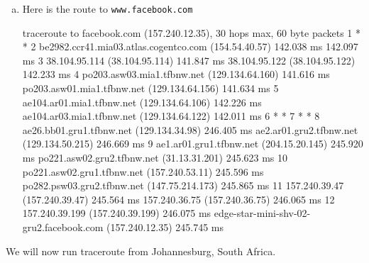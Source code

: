 \begin{enumerate}[a.]
\item Here is the route to {\tt www.facebook.com}
\begin{code}
traceroute to facebook.com (157.240.12.35), 30 hops max, 60 byte packets
 1  * *
 2  be2982.ccr41.mia03.atlas.cogentco.com (154.54.40.57)  142.038 ms  142.097 ms
 3  38.104.95.114 (38.104.95.114)  141.847 ms 38.104.95.122 (38.104.95.122)  142.233 ms
 4  po203.asw03.mia1.tfbnw.net (129.134.64.160)  141.616 ms po203.asw01.mia1.tfbnw.net (129.134.64.156)  141.634 ms
 5  ae104.ar01.mia1.tfbnw.net (129.134.64.106)  142.226 ms ae104.ar03.mia1.tfbnw.net (129.134.64.122)  142.011 ms
 6  * *
 7  * *
 8  ae26.bb01.gru1.tfbnw.net (129.134.34.98)  246.405 ms ae2.ar01.gru2.tfbnw.net (129.134.50.215)  246.669 ms
 9  ae1.ar01.gru1.tfbnw.net (204.15.20.145)  245.920 ms po221.asw02.gru2.tfbnw.net (31.13.31.201)  245.623 ms
10  po221.asw02.gru1.tfbnw.net (157.240.53.11)  245.596 ms po282.psw03.gru2.tfbnw.net (147.75.214.173)  245.865 ms
11  157.240.39.47 (157.240.39.47)  245.564 ms 157.240.36.75 (157.240.36.75)  246.065 ms
12  157.240.39.199 (157.240.39.199)  246.075 ms edge-star-mini-shv-02-gru2.facebook.com (157.240.12.35)  245.745 ms
\end{code}
\end{enumerate}

We will now run traceroute from Johannesburg, South Africa.

